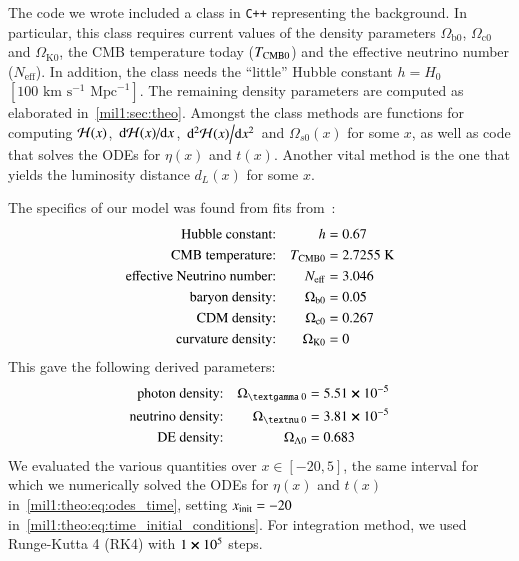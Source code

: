 


The code we wrote included a class in \verb|C++| representing the background. In particular, this class requires current values of the density parameters $\Omega_{\mathrm{b}0}$, $\Omega_{\mathrm{c}0}$ and $\Omega_{\mathrm{K}0}$, the CMB temperature today ($T_{\mathrm{CMB}0}$) and the effective neutrino number ($N_\mathrm{eff}$). In addition, the class needs the ``little'' Hubble constant $h=H_0$~$[100\text{~km}\text{~s}^{-1}\text{~Mpc}^{-1}]$. The remaining density parameters are computed as elaborated in~\cref{mil1:sec:theo}. Amongst the class methods are functions for computing $\mathcal{H}(x)$, $\dv*{\mathcal{H}(x)}{x}$, $\dv*[2]{\mathcal{H}(x)}{x}$ and $\Omega_{s0}(x)$ for some $x$, as well as code that solves the ODEs for $\eta(x)$ and $t(x)$. Another vital method is the one that yields the luminosity distance $d_L(x)$ for some $x$.


The specifics of our model was found from fits from~\citet{Planckdata}:
\begin{equation}\label{mil1:imp:eq:fiducials}
    \begin{split}
        \text{Hubble constant:}&& h &=0.67 \\
        \text{CMB temperature:}&& \TCMB &=2.7255\text{~K} \\
        \text{effective Neutrino number:}&& N\ped{eff}&=3.046\\
        \text{baryon density:}&& \Omega\ped{b 0}&=0.05\\
        \text{CDM density:}&& \Omega\ped{c 0}&=0.267\\
        \text{curvature density:}&& \OmgK&=0
    \end{split}
\end{equation}
This gave the following derived parameters:
\begin{equation}\label{mil1:imp:eq:derived_fiducials}
    \begin{split}
        \text{photon density:}&& \Omega\gped{\textgamma 0}&=5.51 \cross 10^{-5}\\
        \text{neutrino density:}&& \Omega\gped{\textnu 0}&=3.81 \cross 10^{-5}\\
        \text{DE density:}&& \OmgL&=0.683
    \end{split}
\end{equation}
We evaluated the various quantities over $x \in [-20, 5]$, the same interval for which we numerically solved the ODEs for $\eta(x)$ and $t(x)$ in~\cref{mil1:theo:eq:odes_time}, setting $x_\mathrm{init}=-20$ in~\cref{mil1:theo:eq:time_initial_conditions}. For integration method, we used Runge-Kutta 4 (RK4) with $1\cross 10^5$ steps.

